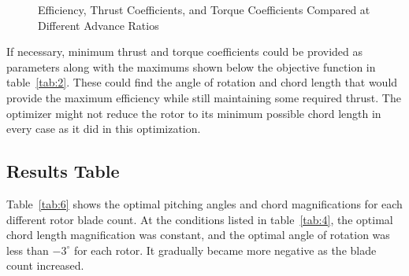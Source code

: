 \documentclass[journal ]{new-aiaa}
\begin{document}
\begin{figure}[H]
\centering

	\hspace{1em}
	\caption{Efficiency, Thrust Coefficients, and Torque Coefficients Compared at Different Advance Ratios}
	\captionsetup{aboveskip=0pt,font=it}
	\label{fig:5}
\end{figure}

If necessary, minimum thrust and torque coefficients could be provided as parameters along with the maximums shown below the objective function in table~\eqref{tab:2}. These could find the angle of rotation and chord length that would provide the maximum efficiency while still maintaining some required thrust. The optimizer might not reduce the rotor to its minimum possible chord length in every case as it did in this optimization.

\subsection{Results Table}

Table~\eqref{tab:6} shows the optimal pitching angles and chord magnifications for each different rotor blade count. At the conditions listed in table~\eqref{tab:4}, the optimal chord length magnification was constant, and the optimal angle of rotation was less than $-3^{\circ}$ for each rotor. It gradually became more negative as the blade count increased.
\end{document}
